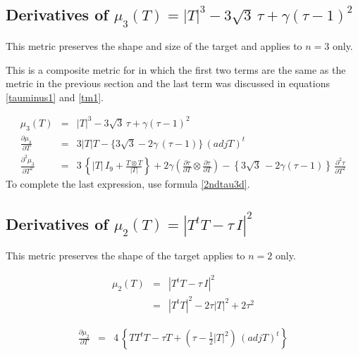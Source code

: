 \documentclass{report}
\begin{document}
\subsection{Derivatives of $\mu_3(T) = |T|^3 - 3 \sqrt{3} \, \tau + \gamma (\tau-1)^2$ \label{ss3d}}

\noindent This metric preserves the shape and size of the target and applies
to $n=3$ only. \newline

\noindent This is a composite metric for in which the first two terms are the 
same as the metric in the previous section and the last term was discussed
in equations \ref{tauminus1} and \ref{tm1}. \newline 

\begin{eqnarray}
\mu_3 (T) & = & |T|^3 - 3 \sqrt{3} \, \tau + \gamma (\tau-1)^2 \\
\frac{\partial \mu_3}{\partial T} & = & 3 |T| T - \{ 3 \sqrt{3} - 2 \gamma \, (\tau-1) \}  \, (adj T)^t \\ \nonumber
\frac{\partial^2 \mu_3}{\partial T^2} & = & 3 \, \left\{ |T| \, I_9 + \frac{T \otimes T}{|T|} \right\} + 2 \gamma \left( \frac{\partial \tau}{\partial T} \otimes \frac{\partial \tau}{\partial T} \right)- \left\{ 3 \sqrt{3} \, - 2 \gamma (\tau-1) \right\} \, \frac{\partial^2 \tau}{\partial T^2}
\end{eqnarray}
To complete the last expression, use formula \ref{2ndtau3d}. \newline

\subsection{Derivatives of $\mu_2(T)=|T^t T - \tau \, I|^2$ \label{shape2d}}

This metric preserves the shape of the target applies to $n=2$ only. \newline

\begin{eqnarray}
\mu_2 (T) & = & |T^t T - \tau \, I|^2 \\
          & = & |T^t T|^2 - 2 \tau |T|^2 + 2 \tau^2 \nonumber
\end{eqnarray}

\begin{eqnarray}
\frac{\partial \mu_2}{\partial T} & = & 4 \, \left\{ T T^t T - \tau T + \left( \tau - \frac{1}{2} |T|^2 \right) \, (adj T)^t \right\}
\end{eqnarray}
\end{document}
